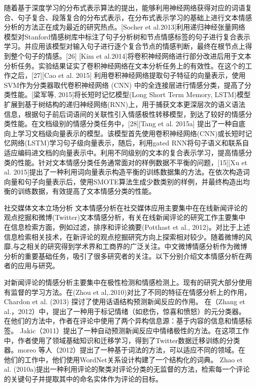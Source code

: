 随着基于深度学习的分布式表示算法的提出，能够利用神经网络获得对应的词语复合、句子复合、段落复合的分布式表示，在分布式表示学习的基础上进行文本情感分析的方法正在成为最近的研究热点。[Socher et al.2013]利用递归神经张量网络模型对Stanford情感树库中标注了句子分析树和节点情感标签的句子进行复合表示学习。并应用该模型对输入句子进行逐个复合节点的情感判断，最终在根节点上得到整个句子的情感。[26] [Kim et al.2014]将卷积神经网络进行部分改进后用于文本分析任务。实验结果证实了卷积神经网络在文本分析任务上的有效性。在这个的工作之后，[27][Cao et al. 2015] 利用卷积神经网络提取句子特征的向量表示，使用SVM作为分类器取代卷积神经网络 (CNN) 中的全连接层进行情感分类，提高了分类性能。[梁军等, 2015]将长短时记忆模型(Long Short Term Memory, LSTM)模型扩展到基于树结构的递归神经网络(RNN)上，用于捕获文本更深层次的语义语法信息，根据句子前后词语间的关联性引入情感极性转移模型，到达了较好的情感分类性能。在文档级别的情感分类任务中，[28][Tang et al. 2015a] 提出了一种自底向上学习文档级向量表示的模型。该模型首先使用卷积神经网络(CNN)或长短时记忆网络(LSTM)学习句子级向量表示，随后，利用gated RNN将句子语义和联系自适应编码进文档的向量表示中。利用不同级别的文本的复合表示学习，提高情感分类的性能。针对文本情感分类任务通常面对的样例数据不平衡的问题，[15][Xu et al. 2015]提出了一种利用词向量表示构造平衡的训练数据集的方法。在依次构造词向量和句子向量表示后，使用SMOTE算法生成少数类别的样例，并最终构造出均衡的训练数据，有效提高了文本情感分类的性能。

社交媒体文本立场分析
文本情感分析在社交媒体应用主要集中在在线新闻评论的观点挖掘和微博(Twitter)文本情感分析，有关在线新闻评论的研究工作主要集中在信息检索方面，例如过滤，排序和评论摘要(Potthast et al., 2012)。对比于上述信息检索相关技术，在新评论的观点挖掘研究方向上探索相对较少。随着微博的风靡,与之相关的研究得到学术界和工商界的广泛关注。中文微博情感分析作为微博分析的重要基础任务，吸引了很多研究者的关注。以下分别介绍文本情感分析在两者的应用与研究。

对新闻评论的情感分析主要集中在极性检测和情感检测上。现有的研究大部分使用有监督的学习方法。在(Zhou et al,.2010)对比了不同的特征在情感分析上的作用，Chardon et al. (2013) 探讨了使用话语结构预测新闻反应的作用。 在（Zhang et al.，2012）中，提出了一种用于标记情绪（如悲伤，惊喜和愤怒）的元分类器。在他们的方法中，作者在评论中使用了两个异构信息源：基于内容的信息和情感标签。 Jakic（2011）提出了一种自动预测新闻反应中情绪极性的方法。在这项工作中，作者使用了领域基础知识和迁移学习，得到了Twitter数据迁移训练的分类器。moreo 等人（2012）提出了一种基于词法的方法，可以适应不同的领域。在他们的工作中，他们使用WordNet关系设计构建了一个结构化的词典。 Zhao et al. (2010a)提出一种利用评论的聚类对评论分类的无监督的方法，检索每一个评论的关键句子并提取其中的命名实体作为评论的目标。

